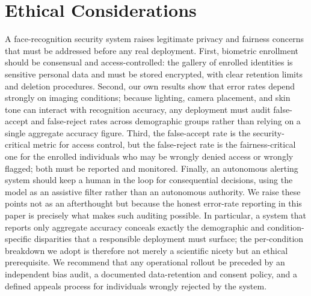 \documentclass[conference]{IEEEtran}
\begin{document}
\section{Ethical Considerations}
\label{sec:ethics}
A face-recognition security system raises legitimate privacy and
fairness concerns that must be addressed before any real
deployment. First, biometric enrollment should be consensual and
access-controlled: the gallery of enrolled identities is
sensitive personal data and must be stored encrypted, with clear
retention limits and deletion procedures. Second, our own results
show that error rates depend strongly on imaging conditions;
because lighting, camera placement, and skin tone can interact
with recognition accuracy, any deployment must audit
false-accept and false-reject rates across demographic groups
rather than relying on a single aggregate accuracy figure.
Third, the false-accept rate is the security-critical metric for
access control, but the false-reject rate is the
fairness-critical one for the enrolled individuals who may be
wrongly denied access or wrongly flagged; both must be reported
and monitored. Finally, an autonomous alerting system should keep
a human in the loop for consequential decisions, using the model
as an assistive filter rather than an autonomous authority. We
raise these points not as an afterthought but because the honest
error-rate reporting in this paper is precisely what makes such
auditing possible. In particular, a system that reports only
aggregate accuracy conceals exactly the demographic and
condition-specific disparities that a responsible deployment must
surface; the per-condition breakdown we adopt is therefore not
merely a scientific nicety but an ethical prerequisite. We
recommend that any operational rollout be preceded by an
independent bias audit, a documented data-retention and consent
policy, and a defined appeals process for individuals wrongly
rejected by the system.

\end{document}
